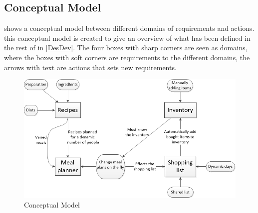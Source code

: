 \subsection{Conceptual Model} \label{ConsMod}
 shows a conceptual model between different domains of requirements and actions. this conceptual model is created to give an overview of what has been defined in the rest of  in \cref{DesDev}. The four boxes with sharp corners are seen as domains, where the boxes with soft corners are requirements to the different domains, the arrows with text are actions that sets new requirements.

\begin{figure}[H]
	\centering
    \includegraphics[width=1\textwidth]{Grafik/conceptualModel}
	\caption{Conceptual Model}
	\label{ConceptualModelPicture}
\end{figure}